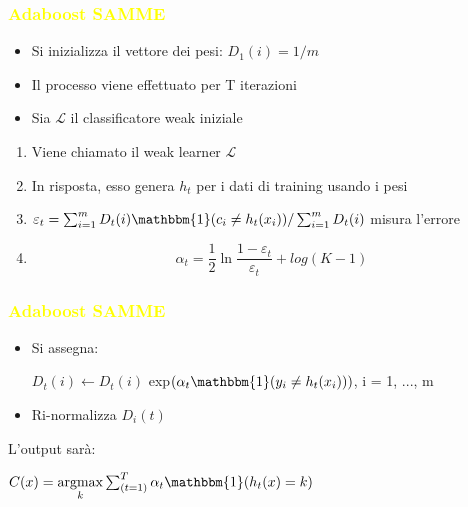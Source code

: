 \documentclass[handout
]{beamer}
\def\yellow#1{{\textcolor{yellow}{#1}}}
\begin{document}
\begin{frame}
\frametitle{\yellow{Adaboost SAMME}}

\begin{itemize}
\item Si inizializza il vettore dei pesi: \begin{math} D_1(i)=1/m \end{math}
\item Il processo viene effettuato per T iterazioni
\item Sia \begin{math} \mathcal{L} \end{math} il classificatore weak iniziale
\end{itemize}
\begin{enumerate}
 \item Viene chiamato il weak learner \begin{math} \mathcal{L} \end{math}
 \item In risposta, esso genera \begin{math} h_t \end{math} per i dati di 
training usando i pesi
\item \begin{math} \varepsilon_t = \sum_{i=1}^m D_t(i) 
\mathbbm{1}(c_i\ne h_t(x_i))/\sum_{i=1}^m D_t(i)\end{math}   misura l'errore
\item \begin{equation} \label{eq:alg} 
\alpha_t=\frac{1}{2}\ln\frac{1-\varepsilon_t}{\varepsilon_t} + log(K-1) \end{equation} 
\end{enumerate}

\end{frame}

\begin{frame}
\frametitle{\yellow{Adaboost SAMME}}
\begin{itemize}
 \item Si assegna:
\begin{center}
 \begin{math}
  D_t(i) \leftarrow D_t(i) 
 \end{math} exp\begin{math}
                (\alpha_t\mathbbm{1}(y_i\ne h_t(x_i)))
               \end{math}, i = 1, ..., m


\end{center}

\item Ri-normalizza \begin{math}
                     D_i(t)
                    \end{math}


\end{itemize}
L'output sar\`a:
\begin{center}
 \begin{math} C(x)= \underset{k}{\operatorname{argmax}}\sum_{(t=1)}^T \alpha_t  
\mathbbm{1}(h_t(x) = k)\end{math}
\end{center}

\end{frame}
\end{document}
